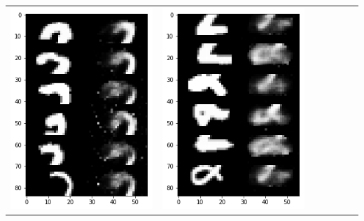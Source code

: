 \documentclass[12pt]{report} %
\begin{document}
\begin{tabular}{m{0.7cm}m{2.4cm}m{2.4cm}m{2.4cm}m{2.4cm}m{2.4cm}m{2.4cm}}
	\includegraphics[scale=0.3]{pictures/M1_2_up.png} & \includegraphics[scale=0.3]{pictures/M1_2_down.png} &

\end{tabular}
\end{document}
